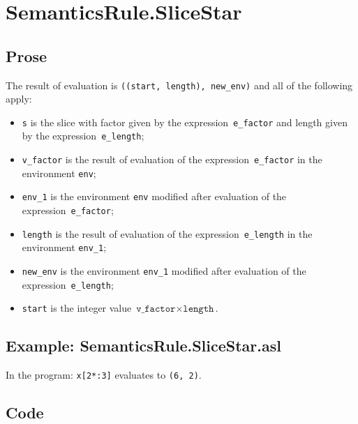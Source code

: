 \documentclass{book}
\begin{document}

\section{SemanticsRule.SliceStar \label{sec:SemanticsRule.SliceStar}}

  \subsection{Prose}
  The result of evaluation is \texttt{((start, length), new\_env)} and all of the following
apply:
  \begin{itemize}
    \item \texttt{s} is the slice with factor given by the
      expression~\texttt{e\_factor} and length given by the
      expression~\texttt{e\_length};
    \item \texttt{v\_factor} is the result of evaluation of the
      expression~\texttt{e\_factor} in the environment \texttt{env};
    \item \texttt{env\_1} is the environment \texttt{env} modified after
      evaluation of the expression~\texttt{e\_factor};
    \item \texttt{length} is the result of evaluation of the
      expression~\texttt{e\_length} in the environment \texttt{env\_1};
    \item \texttt{new\_env} is the environment \texttt{env\_1} modified after
      evaluation of the expression~\texttt{e\_length};
    \item \texttt{start} is the integer value
      $\texttt{v\_factor} \times \texttt{length}$.
  \end{itemize}


  \subsection{Example: SemanticsRule.SliceStar.asl}
  In the program:
  \texttt{x[2*:3]} evaluates to \texttt{(6, 2)}.

  \subsection{Code}
\end{document}
